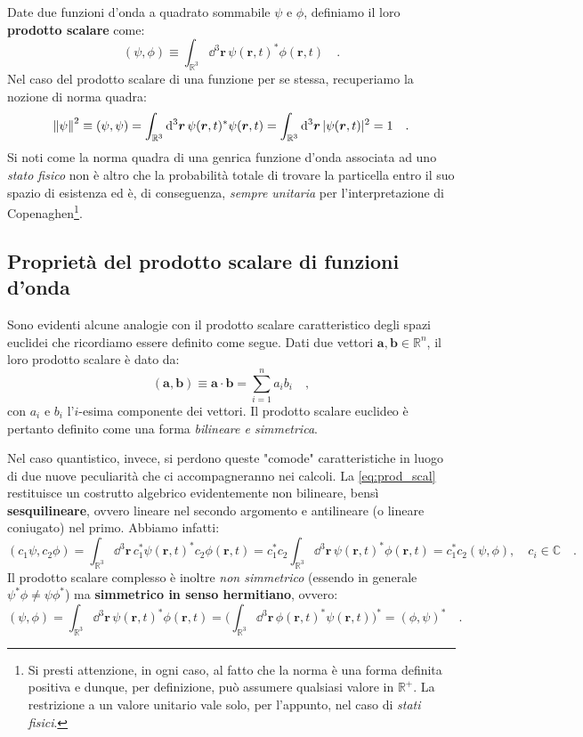 Date due funzioni d'onda a quadrato sommabile $\psi$ e $\phi$, definiamo il loro \textbf{prodotto scalare} come:
\begin{equation}
    (\psi, \phi) \equiv \int_{\mathbb{R}^3} \dd^3{\bm{r}}\, \psi(\bm{r},t)^*\phi(\bm{r},t) \quad.
    \label{eq:prod_scal}
\end{equation}
Nel caso del prodotto scalare di una funzione per se stessa, recuperiamo la nozione di norma quadra:
\[
    \norm{\psi}^2 \equiv (\psi,\psi) = \int_{\mathbb{R}^3} \dd^3{\bm{r}}\, \psi(\bm{r},t)^*\psi(\bm{r},t) = \int_{\mathbb{R}^3}\dd^3{\bm{r}}\, |\psi(\bm{r},t)|^2 = 1 \quad.
\]
Si noti come la norma quadra di una genrica funzione d'onda associata ad uno \emph{stato fisico} non è altro che la probabilità totale di trovare la particella entro il suo spazio di esistenza ed è, di conseguenza, \emph{sempre unitaria} per l'interpretazione di Copenaghen\footnote{Si presti attenzione, in ogni caso, al fatto che la norma è una forma definita positiva e dunque, per definizione, può assumere qualsiasi valore in $\mathbb{R}^+$. La restrizione a un valore unitario vale solo, per l'appunto, nel caso di \emph{stati fisici}.}. 

\subsection{Proprietà del prodotto scalare di funzioni d'onda}
Sono evidenti alcune analogie con il prodotto scalare caratteristico degli spazi euclidei che ricordiamo essere definito come segue. 
Dati due vettori $\bm{a}, \bm{b} \in \mathbb{R}^n$, il loro prodotto scalare è dato da:
\[
    (\bm{a}, \bm{b}) \equiv \bm{a} \cdot \bm{b} = \sum_{i = 1}^n a_ib_i \quad,
\]
con $a_i$ e $b_i$ l'$i$-esima componente dei vettori. Il prodotto scalare euclideo è pertanto definito come una forma \emph{bilineare e simmetrica}.

Nel caso quantistico, invece, si perdono queste "comode" caratteristiche in luogo di due nuove peculiarità che ci accompagneranno nei calcoli. La \eqref{eq:prod_scal} restituisce un costrutto algebrico evidentemente non bilineare, bensì \textbf{sesquilineare}, ovvero lineare nel secondo argomento e antilineare (o lineare coniugato) nel primo. Abbiamo infatti:
\[
    (c_1\psi, c_2\phi) = \int_{\mathbb{R}^3} \dd^3{\bm{r}}\, c_1^*\psi(\bm{r},t)^*c_2\phi(\bm{r},t) = c_1^*c_2 \int_{\mathbb{R}^3} \dd^3{\bm{r}}\, \psi(\bm{r},t)^*\phi(\bm{r},t) = c_1^*c_2 (\psi, \phi), \quad c_i \in \mathbb{C} \quad.
\]
Il prodotto scalare complesso è inoltre \emph{non simmetrico} (essendo in generale $\psi^*\phi \neq \psi\phi^*$) ma \textbf{simmetrico in senso hermitiano}, ovvero:
\[
    (\psi, \phi) = \int_{\mathbb{R}^3} \dd^3{\bm{r}}\, \psi(\bm{r},t)^*\phi(\bm{r},t) = \biggl( \int_{\mathbb{R}^3} \dd^3{\bm{r}}\, \phi(\bm{r},t)^*\psi(\bm{r},t) \biggr)^* = (\phi, \psi)^* \quad.
\]

